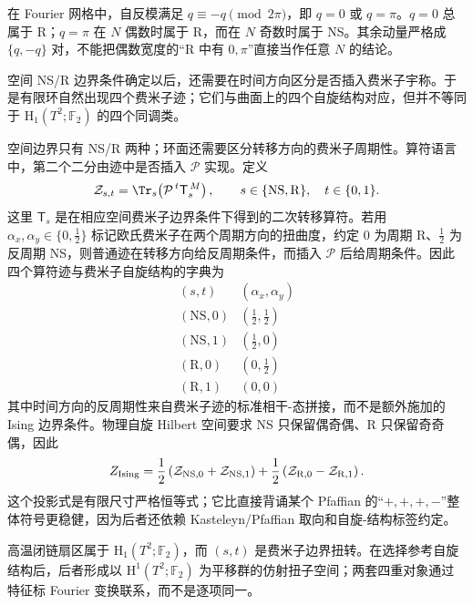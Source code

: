 在 Fourier 网格中，自反模满足 \(q\equiv-q\pmod{2\pi}\)，即 \(q=0\) 或 \(q=\pi\)。\(q=0\) 总属于 R；\(q=\pi\) 在 \(N\) 偶数时属于 R，而在 \(N\) 奇数时属于 NS。其余动量严格成 \(\{q,-q\}\) 对，不能把偶数宽度的“R 中有 \(0,\pi\)”直接当作任意 \(N\) 的结论。

空间 NS/R 边界条件确定以后，还需要在时间方向区分是否插入费米子宇称。于是有限环自然出现四个费米子迹；它们与曲面上的四个自旋结构对应，但并不等同于 \(\mathrm H_1(T^2;\mathbb F_2)\) 的四个同调类。

空间边界只有 NS/R 两种；环面还需要区分转移方向的费米子周期性。算符语言中，第二个二分由迹中是否插入 \(\mathcal P\) 实现。定义
\begin{equation}
 \mathcal Z_{s,t}
 =\Tr_{s}\!\left(
 \mathcal P^{\,t}\mathsf T_s^{\,M}
 \right),
 \qquad
 s\in\{\mathrm{NS},\mathrm R\},
 \quad t\in\{0,1\}.
 \label{eq:phys-sm-four-spin-structures}
\end{equation}
这里 \(\mathsf T_s\) 是在相应空间费米子边界条件下得到的二次转移算符。若用 \(\alpha_x,\alpha_y\in\{0,\tfrac12\}\) 标记欧氏费米子在两个周期方向的扭曲度，约定 \(0\) 为周期 R、\(\tfrac12\) 为反周期 NS，则普通迹在转移方向给反周期条件，而插入 \(\mathcal P\) 后给周期条件。因此四个算符迹与费米子自旋结构的字典为
\[
 \begin{array}{c|c}
 (s,t)&(\alpha_x,\alpha_y)\\ \hline
 (\mathrm{NS},0)&(\tfrac12,\tfrac12)\\
 (\mathrm{NS},1)&(\tfrac12,0)\\
 (\mathrm R,0)&(0,\tfrac12)\\
 (\mathrm R,1)&(0,0)
 \end{array}
\]
其中时间方向的反周期性来自费米子迹的标准相干-态拼接，而不是额外施加的 Ising 边界条件。物理自旋 Hilbert 空间要求 NS 只保留偶奇偶、R 只保留奇奇偶，因此
\begin{equation}
 Z_{\rm Ising}
 =\frac12\left(\mathcal Z_{\mathrm{NS},0}
 +\mathcal Z_{\mathrm{NS},1}\right)
 +\frac12\left(\mathcal Z_{\mathrm R,0}
 -\mathcal Z_{\mathrm R,1}\right).
 \label{eq:phys-sm-kaufman-sector-projection}
\end{equation}
这个投影式是有限尺寸严格恒等式；它比直接背诵某个 Pfaffian 的“\(+,+,+,-\)”整体符号更稳健，因为后者还依赖 Kasteleyn/Pfaffian 取向和自旋-结构标签约定。

高温闭链扇区属于 \(\mathrm H_1(T^2;\mathbb F_2)\)，而 \((s,t)\) 是费米子边界扭转。在选择参考自旋结构后，后者形成以 \(\mathrm H^1(T^2;\mathbb F_2)\) 为平移群的仿射扭子空间；两套四重对象通过特征标 Fourier 变换联系，而不是逐项同一。

